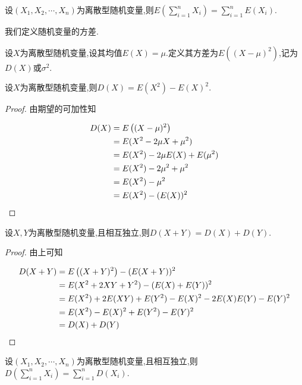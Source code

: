 \documentclass{article}
\begin{document}
\begin{cor}
    设$(X_1, X_2, \cdots, X_n)$为离散型随机变量,则$E \left( \sum\limits_{i = 1}^n X_i \right) = \sum\limits_{i = 1}^n E(X_i)$.
\end{cor}

我们定义随机变量的方差.

\begin{deff}
    设$X$为离散型随机变量,设其均值$E(X) = \mu$.定义其方差为$E \left( (X - \mu)^2 \right)$,记为$D(X)$或$\sigma^2$.
\end{deff}

\begin{prop}
    设$X$为离散型随机变量,则$D(X) = E(X^2) - E(X)^2$.
\end{prop}

\begin{proof}
    由期望的可加性知

    \begin{align*}
        D(X) & = E \left( (X - \mu)^2 \right) \\
        & = E(X^2 - 2 \mu X + \mu^2) \\
        & = E(X^2) - 2 \mu E(X) + E(\mu^2) \\
        & = E(X^2) - 2 \mu^2 + \mu^2 \\
        & = E(X^2) - \mu^2 \\
        & = E(X^2) - (E(X))^2 \qedhere
    \end{align*}
\end{proof}

\begin{prop}
    设$X, Y$为离散型随机变量,且相互独立,则$D(X + Y) = D(X) + D(Y)$.
\end{prop}

\begin{proof}
    由上可知

    \begin{align*}
        D(X + Y) & = E \left( (X + Y)^2 \right) - (E(X + Y))^2 \\
        & = E(X^2 + 2XY + Y^2) - (E(X) + E(Y))^2 \\
        & = E(X^2) + 2E(XY) + E(Y^2) - E(X)^2 - 2E(X)E(Y) - E(Y)^2 \\
        & = E(X^2) - E(X)^2 + E(Y^2) - E(Y)^2 \\
        & = D(X) + D(Y) \qedhere
    \end{align*}
\end{proof}

\begin{cor}
    设$(X_1, X_2, \cdots, X_n)$为离散型随机变量,且相互独立,则$D \left( \sum\limits_{i = 1}^n X_i \right) = \sum\limits_{i = 1}^n D(X_i)$.
\end{cor}
\end{document}
